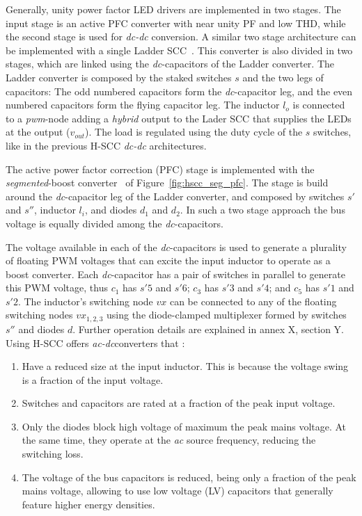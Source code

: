 Generally, unity power factor LED drivers are implemented in two stages. The input stage is an active PFC converter with near unity PF and low THD, while the second stage is used for \emph{dc-dc} conversion. A similar two stage architecture can be implemented with a single Ladder SCC~\cite{segPFC}. This converter is also divided in two stages, which are linked using the \emph{dc}-capacitors of the Ladder converter.  The Ladder converter is composed by the staked switches $s$ and the two legs of capacitors: The odd numbered  capacitors form the \emph{dc}-capacitor leg, and the even numbered capacitors form the flying capacitor leg. The inductor $l_o$ is connected to a \emph{pwm}-node adding a \emph{hybrid} output to the Lader SCC that supplies the LEDs at the output ($v_{out}$). The load is regulated using the duty cycle of the $s$ switches, like in the previous H-SCC \emph{dc-dc} architectures.

The active power factor correction (PFC) stage is implemented with the \emph{segmented}-boost converter~\cite{segPFC} of Figure~\ref{fig:hscc_seg_pfc}. The stage is build around the \emph{dc}-capacitor leg of the Ladder converter, and composed by switches $s'$ and $s''$, inductor $l_i$, and diodes $d_1$ and $d_2$. In such a two stage approach the bus voltage is equally divided among the \emph{dc}-capacitors.

The voltage available in each of the \emph{dc}-capacitors is used to generate a plurality of floating PWM voltages that can excite the input inductor to operate as a boost converter.  Each \emph{dc}-capacitor has a pair of switches in parallel to generate this PWM voltage, thus $c_1$ has $s'5$ and $s'6$; $c_3$ has $s'3$ and $s'4$; and $c_5$ has $s'1$ and $s'2$. The inductor's switching node $vx$ can be connected to any of the floating switching nodes $vx_{1,2,3}$ using the diode-clamped multiplexer formed by switches $s''$ and diodes $d$. Further operation details are explained in annex X, section Y.\\


Using H-SCC offers \emph{ac-dc}converters that :
 \begin{enumerate}

   \item Have a reduced size at the input inductor. This is because the voltage swing is a fraction of the input voltage.

   \item Switches and capacitors are rated at a fraction of the peak input voltage.

   \item Only the diodes block high voltage of  maximum the peak mains voltage. At the same time, they operate at the \emph{ac} source frequency, reducing the switching loss.

   \item The voltage of the bus capacitors is reduced, being only a fraction of the peak mains voltage, allowing to use low voltage (LV) capacitors that generally feature higher energy densities.
 \end{enumerate}

